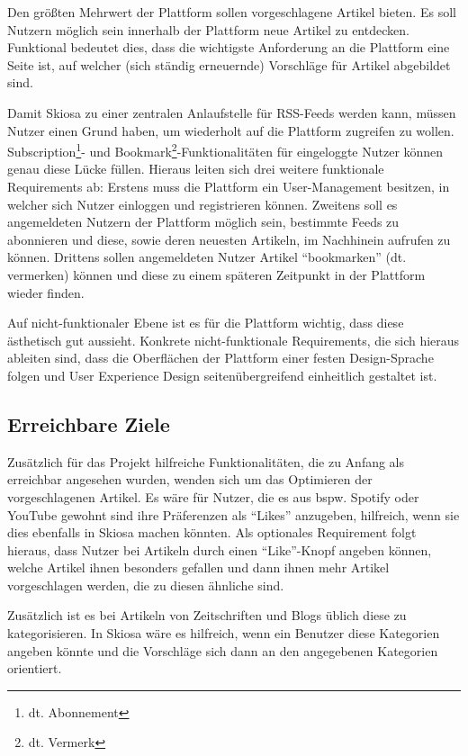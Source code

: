 Den größten Mehrwert der Plattform sollen vorgeschlagene Artikel bieten.
Es soll Nutzern möglich sein innerhalb der Plattform neue Artikel zu entdecken.
Funktional bedeutet dies, dass die wichtigste Anforderung an die Plattform eine Seite ist, auf welcher (sich ständig erneuernde) Vorschläge für Artikel abgebildet sind.

Damit Skiosa zu einer zentralen Anlaufstelle für RSS-Feeds werden kann, müssen Nutzer einen Grund haben, um wiederholt auf die Plattform zugreifen zu wollen.
Subscription\footnote{dt. Abonnement}- und Bookmark\footnote{dt. Vermerk}-Funktionalitäten für eingeloggte Nutzer können genau diese Lücke füllen.
Hieraus leiten sich drei weitere funktionale Requirements ab:
Erstens muss die Plattform ein User-Management besitzen, in welcher sich Nutzer einloggen und registrieren können.
Zweitens soll es angemeldeten Nutzern der Plattform möglich sein, bestimmte Feeds zu abonnieren und diese, sowie deren neuesten Artikeln, im Nachhinein aufrufen zu können.
Drittens sollen angemeldeten Nutzer Artikel \enquote{bookmarken} (dt. vermerken) können und diese zu einem späteren Zeitpunkt in der Plattform wieder finden.

Auf nicht-funktionaler Ebene ist es für die Plattform wichtig, dass diese ästhetisch gut aussieht.
Konkrete nicht-funktionale Requirements, die sich hieraus ableiten sind, dass die Oberflächen der Plattform einer festen Design-Sprache folgen und User Experience Design seitenübergreifend einheitlich gestaltet ist.

\subsection{Erreichbare Ziele}
Zusätzlich für das Projekt hilfreiche Funktionalitäten, die zu Anfang als erreichbar angesehen wurden, wenden sich um das Optimieren der vorgeschlagenen Artikel.
Es wäre für Nutzer, die es aus bspw. Spotify oder YouTube gewohnt sind ihre Präferenzen als \enquote{Likes} anzugeben, hilfreich, wenn sie dies ebenfalls in Skiosa machen könnten.
Als optionales Requirement folgt hieraus, dass Nutzer bei Artikeln durch einen \enquote{Like}-Knopf angeben können, welche Artikel ihnen besonders gefallen und dann ihnen mehr Artikel vorgeschlagen werden, die zu diesen ähnliche sind.

Zusätzlich ist es bei Artikeln von Zeitschriften und Blogs üblich diese zu kategorisieren.
In Skiosa wäre es hilfreich, wenn ein Benutzer diese Kategorien angeben könnte und die Vorschläge sich dann an den angegebenen Kategorien orientiert.

